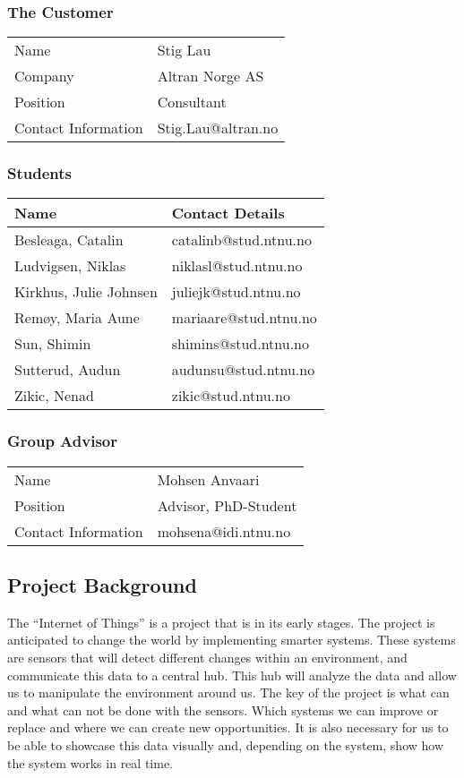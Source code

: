 \documentclass[../document.tex]{subfiles}
\begin{document}
\subsubsection{The Customer}
\begin{tabular}{ll}
\hline
Name					&	Stig Lau\\
Company				&	Altran Norge AS\\
Position				&	Consultant\\
Contact Information		&	Stig.Lau@altran.no\\
\hline
\end{tabular}

\subsubsection{Students}
\begin{tabular}{ll}
\hline
Name				&	Contact Details\\ \hline
Besleaga, Catalin		&	catalinb@stud.ntnu.no\\
Ludvigsen, Niklas		&	niklasl@stud.ntnu.no\\
Kirkhus, Julie Johnsen	&	juliejk@stud.ntnu.no\\
Remøy, Maria Aune		&	mariaare@stud.ntnu.no\\
Sun, Shimin			&	shimins@stud.ntnu.no\\
Sutterud, Audun		&	audunsu@stud.ntnu.no\\
Zikic, Nenad			&	zikic@stud.ntnu.no\\
\hline
\end{tabular}

\subsubsection{Group Advisor}
\begin{tabular}{ll}
\hline
Name				&	Mohsen Anvaari\\
Position			&	Advisor, PhD-Student\\
Contact Information	&	mohsena@idi.ntnu.no\\
\hline
\end{tabular}

\subsection{Project Background}
The “Internet of Things” is a project that is in its early stages. The project is anticipated to change the world by implementing smarter systems. These systems are sensors that will detect different changes within an environment, and communicate this data to a central hub. This hub will analyze the data and allow us to manipulate the environment around us. The key of the project is what can and what can not be done with the sensors. Which systems we can improve or replace and where we can create new opportunities. It is also necessary for us to be able to showcase this data visually and, depending on the system, show how the system works in real time.
\end{document}
